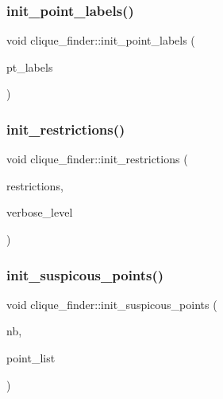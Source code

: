 \subsubsection{\texorpdfstring{init\+\_\+point\+\_\+labels()}{init\_point\_labels()}}
{\footnotesize\ttfamily void clique\+\_\+finder\+::init\+\_\+point\+\_\+labels (\begin{DoxyParamCaption}\item[{\mbox{\hyperlink{galois_8h_a09fddde158a3a20bd2dcadb609de11dc}{I\+NT}} $\ast$}]{pt\+\_\+labels }\end{DoxyParamCaption})}

\mbox{\label{classclique__finder_a8ca9c5b2162ff6a95f00c329f33c60e0}} 
\subsubsection{\texorpdfstring{init\+\_\+restrictions()}{init\_restrictions()}}
{\footnotesize\ttfamily void clique\+\_\+finder\+::init\+\_\+restrictions (\begin{DoxyParamCaption}\item[{\mbox{\hyperlink{galois_8h_a09fddde158a3a20bd2dcadb609de11dc}{I\+NT}} $\ast$}]{restrictions,  }\item[{\mbox{\hyperlink{galois_8h_a09fddde158a3a20bd2dcadb609de11dc}{I\+NT}}}]{verbose\+\_\+level }\end{DoxyParamCaption})}

\mbox{\label{classclique__finder_a2f2b8331c4728e5edccd28ac0ffb7dbd}} 
\subsubsection{\texorpdfstring{init\+\_\+suspicous\+\_\+points()}{init\_suspicous\_points()}}
{\footnotesize\ttfamily void clique\+\_\+finder\+::init\+\_\+suspicous\+\_\+points (\begin{DoxyParamCaption}\item[{\mbox{\hyperlink{galois_8h_a09fddde158a3a20bd2dcadb609de11dc}{I\+NT}}}]{nb,  }\item[{\mbox{\hyperlink{galois_8h_a09fddde158a3a20bd2dcadb609de11dc}{I\+NT}} $\ast$}]{point\+\_\+list }\end{DoxyParamCaption})}

